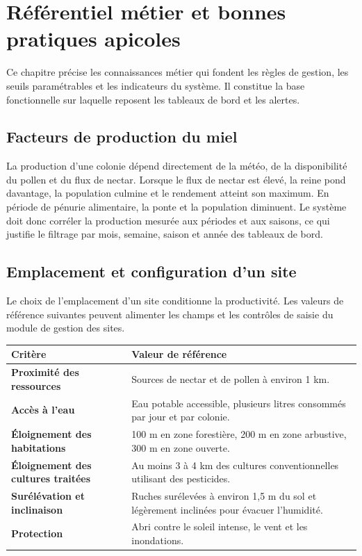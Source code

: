 \chapter{Référentiel métier et bonnes pratiques apicoles}
Ce chapitre précise les connaissances métier qui fondent les règles de gestion,
les seuils paramétrables et les indicateurs du système. Il constitue la base
fonctionnelle sur laquelle reposent les tableaux de bord et les alertes.

\section{Facteurs de production du miel}
La production d'une colonie dépend directement de la météo, de la disponibilité
du pollen et du flux de nectar. Lorsque le flux de nectar est élevé, la reine
pond davantage, la population culmine et le rendement atteint son maximum. En
période de pénurie alimentaire, la ponte et la population diminuent. Le système
doit donc corréler la production mesurée aux périodes et aux saisons, ce qui
justifie le filtrage par mois, semaine, saison et année des tableaux de bord.

\section{Emplacement et configuration d'un site}
Le choix de l'emplacement d'un site conditionne la productivité. Les valeurs de
référence suivantes peuvent alimenter les champs et les contrôles de saisie du
module de gestion des sites.
\begin{xltabular}{\textwidth}{>{\bfseries}p{5.5cm} X}
\toprule
\textbf{Critère} & \textbf{Valeur de référence} \\
\midrule
\endhead
Proximité des ressources & Sources de nectar et de pollen à environ 1 km. \\
Accès à l'eau & Eau potable accessible, plusieurs litres consommés par jour et par colonie. \\
Éloignement des habitations & 100 m en zone forestière, 200 m en zone arbustive, 300 m en zone ouverte. \\
Éloignement des cultures traitées & Au moins 3 à 4 km des cultures conventionnelles utilisant des pesticides. \\
Surélévation et inclinaison & Ruches surélevées à environ 1,5 m du sol et légèrement inclinées pour évacuer l'humidité. \\
Protection & Abri contre le soleil intense, le vent et les inondations. \\
\bottomrule
\end{xltabular}

